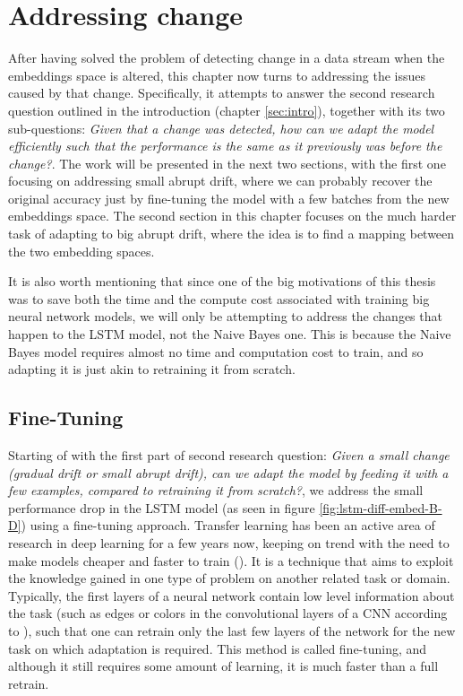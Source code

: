 \documentclass[12pt]{extreport}
\begin{document}
\chapter{Addressing change} \label{sec:addressing}

After having solved the problem of detecting change in a data stream when the embeddings space is altered, this chapter now turns to addressing the issues caused by that change. Specifically, it attempts to answer the second research question outlined in the introduction (chapter \ref{sec:intro}), together with its two sub-questions: \emph{Given that a change was detected, how can we adapt the model efficiently such that the performance is the same as it previously was before the change?}. The work will be presented in the next two sections, with the first one focusing on addressing small abrupt drift, where we can probably recover the original accuracy just by fine-tuning the model with a few batches from the new embeddings space. The second section in this chapter focuses on the much harder task of adapting to big abrupt drift, where the idea is to find a mapping between the two embedding spaces.

It is also worth mentioning that since one of the big motivations of this thesis was to save both the time and the compute cost associated with training big neural network models, we will only be attempting to address the changes that happen to the LSTM model, not the Naive Bayes one. This is because the Naive Bayes model requires almost no time and computation cost to train, and so adapting it is just akin to retraining it from scratch.

\section{Fine-Tuning} \label{sec:fine}

Starting of with the first part of second research question: \emph{Given a small change (gradual drift or small abrupt drift), can we adapt the model by feeding it with a few examples, compared to retraining it from scratch?}, we address the small performance drop in the LSTM model (as seen in figure \ref{fig:lstm-diff-embed-B-D}) using a fine-tuning approach. Transfer learning has been an active area of research in deep learning for a few years now, keeping on trend with the need to make models cheaper and faster to train (\cite{survey-transfer-learning}). It is a technique that aims to exploit the knowledge gained in one type of problem on another related task or domain. Typically, the first layers of a neural network contain low level information about the task (such as edges or colors in the convolutional layers of a CNN according to \cite{survey-transfer-learning}), such that one can retrain only the last few layers of the network for the new task on which adaptation is required. This method is called fine-tuning, and although it still requires some amount of learning, it is much faster than a full retrain.
\end{document}
